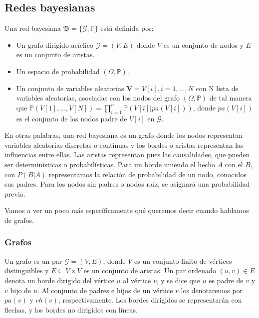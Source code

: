 \subsection{Redes bayesianas} \label{subsect: BN}
\begin{definicion} \label{def:BN}
Una red bayesiana \cite{def-bncn} $\mathfrak{B} = \lbrace \mathcal{G}, \mathbb{P} \rbrace$ está definida por:
\begin{itemize}
    \item Un grafo dirigido acíclico $\mathcal{G}=(V,E)$ donde $V$ es un conjunto de nodos y $E$ 
    es un conjunto de aristas.
    \item Un espacio de probabilidad $(\Omega, \mathbb{P})$.
    \item Un conjunto de variables aleatorias $\textbf{V}=V[i], i=1,...,N$ con N lista de variables aleatorias, 
    asociadas con los nodos del grafo $(\Omega, \mathbb{P})$ 
    de tal manera que $\mathbb{P}(V[1],...,V[N])= \prod_{i=1}^{n}\mathbb{P}(V[i]|pa(V[i]))$, donde $pa(V[i])$ es el 
    conjunto de los nodos padre de $V[i]$ en $\mathcal{G}$.  
\end{itemize}
\end{definicion} 

En otras palabras, una red bayesiana es un grafo donde los nodos representan variables aleatorias discretas 
o contínuas y los bordes o aristas representan las influencias entre ellas. Las aristas 
representan pues las causalidades, que pueden ser determinísticas o probabilísticas. Para un borde 
uniendo el hecho $A$ con el $B$, con $P(B|A)$ representamos la relación de probabilidad de un 
nodo, conocidos sus padres. Para los nodos sin padres o nodos raíz, se asignará una probabilidad previa.

Vamos a ver un poco más específicamente qué queremos decir cuando hablamos de grafos.
\subsubsection{Grafos}
\begin{definicion} \label{def:grafo}
Un grafo es un par $\mathcal{G} = (V, E)$, donde $V$ es un conjunto finito de vértices distinguibles y 
$E \subseteq V \times V$ es un conjunto de aristas. Un par ordenado $(u, v) \in E$ denota un borde dirigido
del vértice $u$ al vértice $v$, y se dice que $u$ es padre de $v$ y $v$ hijo de $u$. Al conjunto de padres 
e hijos de un vértice $v$ los denotaremos por $pa(v)$ y $ch(v)$, respectivamente. Los bordes dirigidos 
se representarán con flechas, y los bordes no dirigidos con líneas. 
\end{definicion}

